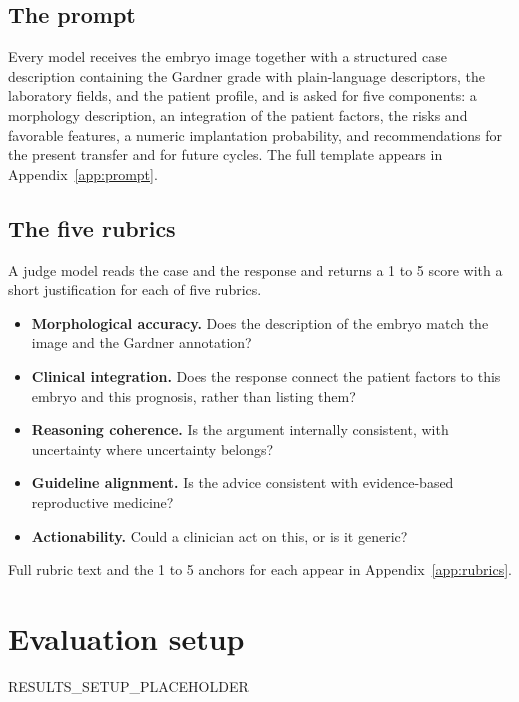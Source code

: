 \documentclass[11pt]{article}
\begin{document}
\subsection{The prompt}

Every model receives the embryo image together with a structured case
description containing the Gardner grade with plain-language descriptors, the
laboratory fields, and the patient profile, and is asked for five components: a
morphology description, an integration of the patient factors, the risks and
favorable features, a numeric implantation probability, and recommendations for
the present transfer and for future cycles. The full template appears in
Appendix~\ref{app:prompt}.

\subsection{The five rubrics}

A judge model reads the case and the response and returns a 1 to 5 score with a
short justification for each of five rubrics.

\begin{itemize}
\item \textbf{Morphological accuracy.} Does the description of the embryo match the
      image and the Gardner annotation?
\item \textbf{Clinical integration.} Does the response connect the patient factors
      to this embryo and this prognosis, rather than listing them?
\item \textbf{Reasoning coherence.} Is the argument internally consistent, with
      uncertainty where uncertainty belongs?
\item \textbf{Guideline alignment.} Is the advice consistent with evidence-based
      reproductive medicine?
\item \textbf{Actionability.} Could a clinician act on this, or is it
      generic?
\end{itemize}

Full rubric text and the 1 to 5 anchors for each appear in
Appendix~\ref{app:rubrics}.

\section{Evaluation setup}
\label{sec:setup}

RESULTS_SETUP_PLACEHOLDER

\end{document}
